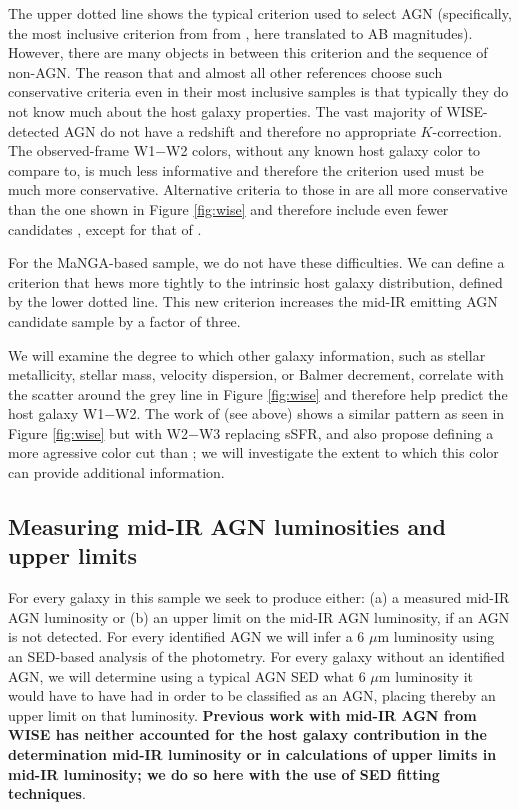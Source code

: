 \documentclass[12pt, preprint]{hacked-aastex}
\begin{document}
The upper dotted line shows the typical criterion used to select AGN
(specifically, the most inclusive criterion from from \cite{assef18a},
here translated to AB magnitudes). However, there are many objects in
between this criterion and the sequence of non-AGN. The reason that
\cite{assef18a} and almost all other references choose such conservative
criteria even in their most inclusive samples is that typically they
do not know much about the host galaxy properties.  The vast majority
of WISE-detected AGN do not have a redshift and therefore no
appropriate $K$-correction. The observed-frame W1$-$W2 colors, without
any known host galaxy color to compare to, is much less informative
and therefore the criterion used must be much more
conservative. Alternative criteria to those in \cite{assef18a} are
all more conservative than the one shown in Figure \ref{fig:wise} and
therefore include even fewer candidates \cite{jarrett11a,stern12a}, 
except for that of \cite{hviding22a}.

For the MaNGA-based sample, we do not have these 
difficulties. We can define a criterion that hews more tightly 
to the intrinsic host galaxy distribution, defined by the lower 
dotted line. This new criterion increases the mid-IR emitting AGN 
candidate sample by a factor of three.

We will examine the degree to which other galaxy information,
such as stellar metallicity, stellar mass, velocity dispersion,
or Balmer decrement, correlate with the scatter around the grey line in 
Figure \ref{fig:wise} and therefore help predict the host galaxy
W1$-$W2. The work of \cite{hviding22a} (see above) shows a similar
pattern as seen in Figure \ref{fig:wise} but with W2$-$W3 replacing
sSFR, and also propose defining a more agressive color cut than
\cite{assef18a}; we 
will investigate the extent to which this color can provide 
additional information.

\subsection{Measuring mid-IR AGN luminosities and upper limits}
\label{sec:measurements}

For every galaxy in this sample we seek to produce either: (a) a
measured mid-IR AGN luminosity or (b) an upper limit on the mid-IR AGN
luminosity, if an AGN is not detected. For every identified AGN we
will infer a 6 $\mu$m luminosity using an SED-based analysis of the
photometry. For every galaxy without an identified AGN, we will
determine using a typical AGN SED what 6 $\mu$m luminosity it would
have to have had in order to be classified as an AGN, placing thereby
an upper limit on that luminosity. {\bf Previous work with mid-IR AGN
  from WISE has neither accounted for the host galaxy contribution in
  the determination mid-IR luminosity or in calculations of upper
  limits in mid-IR luminosity; we do so here with the use of SED
  fitting techniques}.
\end{document}
